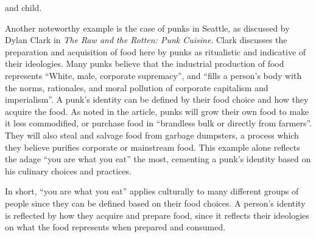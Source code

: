 \documentclass[letterpaper, 12pt]{article}
\begin{document}
and child. \par
Another noteworthy example is the case of punks in Seattle, as discussed by
Dylan Clark in \textit{The Raw and the Rotten: Punk Cuisine}. Clark discusses
the preparation and acquisition of food here by punks as ritualistic and
indicative of their ideologies. Many punks believe that the industrial
production of food represents ``White, male, corporate supremacy'', and ``fills
a person's body with the norms, rationales, and moral pollution of corporate
capitalism and imperialism''. A punk's identity can be defined by their food
choice and how they acquire the food. As noted in the article, punks will grow
their own food to make it less commodified, or purchase food in ``brandless
bulk or directly from farmers''. They will also steal and salvage food from
garbage dumpsters, a process which they believe purifies corporate or
mainstream food. This example alone reflects the adage ``you are what you eat''
the most, cementing a punk's identity based on his culinary choices and
practices. \par
In short, ``you are what you eat'' applies culturally to many different groups
of people since they can be defined based on their food choices. A person's
identity is reflected by how they acquire and prepare food, since it reflects
their ideologies on what the food represents when prepared and consumed.
\end{document}
